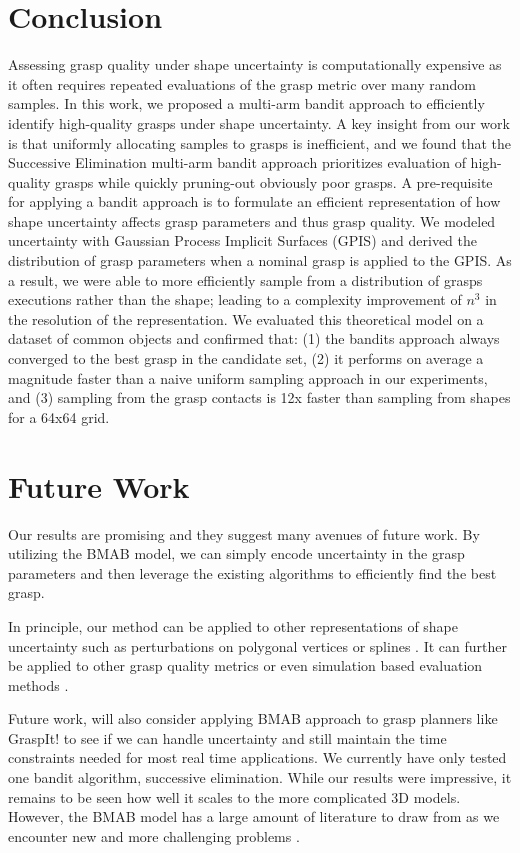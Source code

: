 \documentclass[letterpaper, 10 pt, conference]{ieeeconf}  %
\begin{document}
\section{Conclusion}
Assessing grasp quality under shape uncertainty is computationally expensive as it often requires repeated evaluations of the grasp metric over many random samples.
In this work, we proposed a multi-arm bandit approach to efficiently identify high-quality grasps under shape uncertainty. 
A key insight from our work is that uniformly allocating samples to grasps is inefficient, and
 we found that the Successive Elimination multi-arm bandit approach prioritizes evaluation of high-quality grasps while quickly pruning-out obviously poor grasps.
A pre-requisite for applying a bandit approach is to formulate an efficient representation of how shape uncertainty affects grasp parameters and thus grasp quality.
We modeled uncertainty with Gaussian Process Implicit Surfaces (GPIS) and derived the distribution of grasp parameters when a nominal grasp is applied to the GPIS.
As a result, we were able to more efficiently sample from a distribution of grasps executions rather than the shape; leading to a complexity improvement of $n^3$ in the resolution of the representation.
We evaluated this theoretical model on a dataset of common objects and confirmed that: (1) the bandits approach always converged to the best grasp in the candidate set, (2) it performs on average a magnitude faster than a naive uniform sampling approach in our experiments, and (3) sampling from the grasp contacts is 12x faster than sampling from shapes for a 64x64 grid.



\section{Future Work}
Our results are promising and they suggest many avenues of future work. By utilizing the BMAB model, we can simply encode uncertainty in the grasp parameters and then leverage the existing algorithms to efficiently find the best grasp. 

In principle, our method can be applied to other representations of shape uncertainty such as perturbations on polygonal vertices \cite{kehoe2012estimating} or splines \cite{christopoulos2007handling}.
It can further be applied to other grasp quality metrics or even simulation based evaluation methods \cite{73}. 

Future work, will also consider applying BMAB approach to grasp planners like GraspIt! \cite{miller2004graspit} to see if we can handle uncertainty and still maintain the time constraints needed for most real time applications. We currently have only tested one bandit algorithm, successive elimination. While our results were impressive, it remains to be seen how well it scales to the more complicated 3D models. However, the BMAB model has a large amount of literature to draw from as we encounter new and more challenging problems \cite{bergemann2006bandit}.



\end{document}
